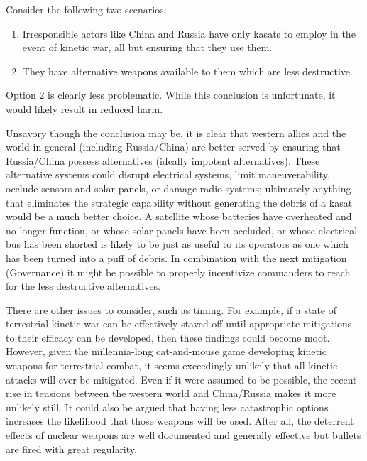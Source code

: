 Consider the following two scenarios:

\begin{enumerate}
\item Irresponsible actors like China and Russia have only \acp{kasat}
  to employ in the event of kinetic war, all but ensuring that they
  use them.

\item They have alternative weapons available to them which are less
  destructive.
\end{enumerate}

Option 2 is clearly less problematic.  While this conclusion is
unfortunate, it would likely result in reduced harm.

Unsavory though the conclusion may be, it is clear that western allies
and the world in general (including Russia/China) are better served by
ensuring that Russia/China possess alternatives (ideally impotent
alternatives).  These alternative systems could disrupt electrical
systems, limit maneuverability, occlude sensors and solar panels, or
damage radio systems; ultimately anything that eliminates the
strategic capability without generating the debris of a \ac{kasat}
would be a much better choice.  A satellite whose batteries have
overheated and no longer function, or whose solar panels have been
occluded, or whose electrical bus has been shorted is likely to be
just as useful to its operators as one which has been turned into a
puff of debris.  In combination with the next mitigation (Governance)
it might be possible to properly incentivize commanders to reach for
the less destructive alternatives.

There are other issues to consider, such as timing.  For example, if a
state of terrestrial kinetic war can be effectively staved off until
appropriate mitigations to their efficacy can be developed, then these
findings could become moot.  However, given the millennia-long
cat-and-mouse game developing kinetic weapons for terrestrial combat,
it seems exceedingly unlikely that all kinetic attacks will ever be
mitigated.  Even if it were assumed to be possible, the recent rise in
tensions between the western world and China/Russia makes it more
unlikely still. It could also be argued that having less catastrophic
options increases the likelihood that those weapons will be used.
After all, the deterrent effects of nuclear weapons are well
documented and generally effective\cite[mad]{xxx} but bullets are
fired with great regularity.

